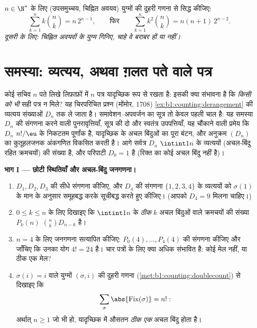 \begin{exercise}[$\star\star\star$]\label{exo:b1:counting:12}
$n \in \N^*$ के लिए (उपसमुच्चय, चिह्नित अवयव) युग्मों की दुहरी गणना से सिद्ध
कीजिए:
\[
\sum_{k=1}^{n} k \binom{n}{k} = n\, 2^{n-1},
\qquad\text{फिर}\qquad
\sum_{k=1}^{n} k^2 \binom{n}{k} = n(n+1)\, 2^{n-2} .
\]
\emph{दूसरी के लिए: चिह्नित अवयवों के युग्म गिनिए, चाहे वे बराबर हों या
नहीं।}
\end{exercise}

\section{समस्या: व्यत्यय, अथवा ग़लत पते वाले पत्र}

\begin{problem}\label{pb:b1:counting:1}
कोई सचिव $n$ पते लिखे लिफ़ाफ़ों में $n$ पत्र यादृच्छिक रूप से रखता है: इसकी
क्या संभावना है कि \emph{किसी को भी} सही पत्र न मिले? यह चिरपरिचित प्रश्न
(मोंमोर, 1708) \cref{ex:b1:counting:derangement} की व्यत्यय संख्याओं $D_n$
तक ले जाता है। समावेशन--अपवर्जन का सूत्र तो केवल पहली चाल है: यह समस्या
$D_n$ की संगणना करने वाली पुनरावृत्तियाँ, सूत्र की दो और स्वतंत्र
उपपत्तियाँ, यह चौंकाने वाली प्रमेय कि $D_n$ $n!/\eu$ के निकटतम पूर्णांक है,
यादृच्छिक  के अचल बिंदुओं का पूरा बंटन, और अनुक्रम $(D_n)$ का
कुतूहलजनक अंकगणित विकसित करती है। आगे सर्वत्र $D_n$
$\intint1n$ के व्यत्ययों (अचल-बिंदु रहित क्रमचयों) की संख्या है, और परिपाटी
$D_0 = 1$ है (रिक्त  का कोई अचल बिंदु नहीं है)।

\medskip \noindent\textbf{भाग I --- छोटी स्थितियाँ और अचल-बिंदु जनगणना।}
\begin{enumerate}
  \item $D_1, D_2, D_3$ की सीधे संगणना कीजिए, और $D_4$ की संगणना $\{1, 2, 3,
  4\}$ के व्यत्ययों को $\sigma(1)$ के मान के अनुसार समूहबद्ध करके सूचीबद्ध
  करते हुए कीजिए। (आपको $D_4 = 9$ मिलना चाहिए।)
  \item $0 \leq k \leq n$ के लिए दिखाइए कि $\intint1n$ के \emph{ठीक} $k$ अचल
  बिंदुओं वाले क्रमचयों की संख्या $P_k(n)$ $\binom nk D_{n-k}$ है।
  \item $n = 4$ के लिए जनगणना सत्यापित कीजिए: $P_0(4), \dots, P_4(4)$ की
  संगणना कीजिए और जाँचिए कि उनका योग $4! = 24$ है। चार पत्रों के लिए क्या
  अधिक संभावित है: कोई मेल नहीं, या ठीक एक मेल?
  \item $\sigma(i) = i$ वाले युग्मों $(\sigma, i)$ की दुहरी गणना
  (\cref{met:b1:counting:doublecount}) से दिखाइए कि
        \[
        \sum_{\sigma} \abs{\mathrm{Fix}(\sigma)} = n! :
        \]
        अर्थात् $n \geq 1$ जो भी हो, यादृच्छिक  में औसतन \emph{ठीक एक}
        अचल बिंदु होता है।
\end{enumerate}


\end{problem}
